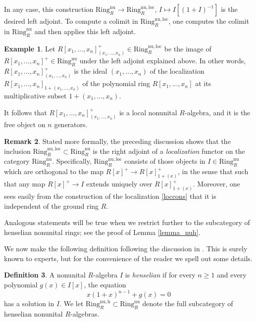 \documentclass{amsart}
\theoremstyle{definition}
\newtheorem{definition}{Definition}[section]
\newtheorem{example}[definition]{Example}
\newtheorem{remark}[definition]{Remark}
\newcommand{\nuloc}{\mathrm{Ring}^{\mathrm{nu,loc}}_R}
\newcommand{\nur}{\mathrm{Ring}^{\mathrm{nu}}_R}
\newcommand{\nuh}{\mathrm{Ring}^{\mathrm{nu,h}}_R}
\begin{document}
In any case, this construction $\nur\to \nuloc$, $I \mapsto I[(1 + I)^{-1}]$ is the desired left adjoint.
To compute a colimit in $\nuloc$, one computes the colimit in $\nur$ and
then applies this left adjoint. 
\begin{example} 
Let $R[x_1, \dots, x_n]^+_{(x_1, \dots, x_n)}\in\nuloc$ be the image of $R[x_1, \dots, x_n]^+\in\nur$ under the left adjoint explained above. In other words, $R[x_1, \dots, x_n]^+_{(x_1, \dots, x_n)}$ is the ideal $(x_1,
\dots, x_n)$ of the localization $R[x_1, \dots, x_n]_{1 + (x_1, \dots, x_n)}$ of
the polynomial ring $R[x_1, \dots, x_n]$ at its 
multiplicative subset $1 + (x_1, \dots, x_n)$.

It follows that 
$R[x_1, \dots, x_n]^+_{(x_1, \dots, x_n)}$  is a local nonunital $R$-algebra,
and it is the free object on $n$ generators. 
\end{example} 

\begin{remark} 
Stated more formally, the preceding discussion shows that the inclusion $\nuloc \subset \nur$ is the right adjoint of a
\emph{localization} functor on the category $\nur$. Specifically, $\nuloc$
consists of those objects in $I \in \nur$ which are orthogonal \cite[Sec.
5.4]{Borceux1} to the map
$R[x]^+ \to R[x]^+_{1 + (x)}$, in the sense that such that any map $R[x]^+ \to I$ extends
uniquely over $R[x]^+_{1 + (x)}$.  Moreover, one sees easily from the
construction of the  localization \eqref{loccons} that it is independent of the ground ring $R$.

Analogous statements will be true when we restrict further to the subcategory of henselian nonunital rings; see the proof of Lemma \ref{lemma_nuh}.
\end{remark} 

We now make the following definition following the discussion in \cite{gabber}.
This is surely known to experts, but for the convenience of the reader we spell
out some details. 
\begin{definition} \label{def_hens_nu}
A nonunital $R$-algebra $I$ is \emph{henselian} if 
for every  $n \geq 1$ and every polynomial $g(x) \in I[x]$, the equation
\begin{equation}\label{henseq} x(1 +
x)^{n-1} + g(x)  = 0 \end{equation} has a solution in $I$. 
We let $\nuh \subset \nur$ denote the full subcategory of henselian
nonunital $R$-algebras. 
\end{definition} 
\end{document}
